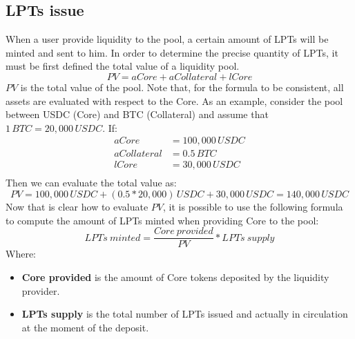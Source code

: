 \documentclass[12pt]{paper}
\begin{document}
	\subsection{LPTs issue}
	\label{subsec:issue}
		When a user provide liquidity to the pool, a certain amount of LPTs will be minted and sent to him. In order to determine the precise quantity of LPTs, it must be first defined the total value of a liquidity pool.
		\begin{equation}
			PV = aCore + aCollateral + lCore
		\end{equation}
		$PV$ is the total value of the pool. Note that, for the formula to be consistent, all assets are evaluated with respect to the Core. As an example, consider the pool between USDC (Core) and BTC (Collateral) and assume that $1 \, BTC = 20,000 \, USDC$. If:
		\begin{equation*}
			\begin{split}
				aCore &= 100,000 \, USDC\\
				aCollateral &= 0.5 \, BTC\\
				lCore &= 30,000 \, USDC\\
			\end{split}
		\end{equation*}
		Then we can evaluate the total value as:
		\begin{equation*}
			PV = 100,000 \, USDC + (0.5*20,000) \, USDC + 30,000 \, USDC = 140,000 \, USDC
		\end{equation*}
		Now that is clear how to evaluate $PV$, it is possible to use the following formula to compute the amount of LPTs minted when providing Core to the pool:
		\begin{equation}
			LPTs\ minted = \frac{Core\ provided}{PV}*LPTs\ supply
		\end{equation}
		Where:
		\begin{itemize}
			\item \textbf{Core provided} is the amount of Core tokens deposited by the liquidity provider.
			\item \textbf{LPTs supply} is the total number of LPTs issued and actually in circulation at the moment of the deposit.
		\end{itemize}
		
\end{document}
